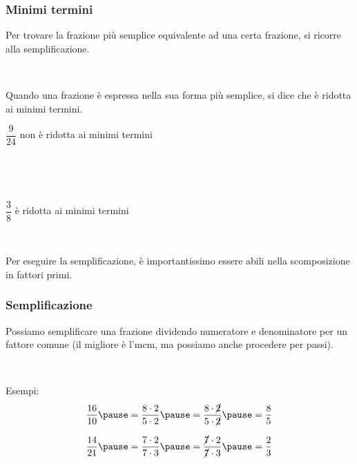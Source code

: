 \documentclass[]{beamer}
\theoremstyle{plain}
\begin{document}
\begin{frame}
\frametitle{Minimi termini}
Per trovare la frazione \alert{più semplice} equivalente ad una certa frazione, si ricorre alla \alert{semplificazione}.\pause

~

Quando una frazione è espressa nella sua forma più semplice, si dice che è \alert{ridotta ai minimi termini}.

\begin{center}
  $ \dfrac{9}{24} $ \alert{non} è ridotta ai minimi termini


  ~

  ~

  $ \dfrac{3}{8} $ è ridotta ai minimi termini
\end{center}\pause

~

Per eseguire la semplificazione, è importantissimo essere abili nella \alert{scomposizione in fattori primi}.
\end{frame}

\begin{frame}
\frametitle{Semplificazione}
Possiamo semplificare una frazione \alert{dividendo numeratore e denominatore} per un fattore comune (il migliore è l'mcm, ma possiamo anche procedere per passi).\pause

~

Esempi:
\[ \frac{16}{10}\pause = \frac{8 \cdot 2}{5 \cdot 2}\pause = \frac{8 \cdot \cancel{2}}{5 \cdot \cancel{2}}\pause = \frac{8}{5} \]\pause

\[ \frac{14}{21}\pause = \frac{7 \cdot 2}{7 \cdot 3}\pause = \frac{\cancel{7}\cdot 2}{\cancel{7} \cdot 3}\pause = \frac{2}{3} \]
\end{frame}
\end{document}

